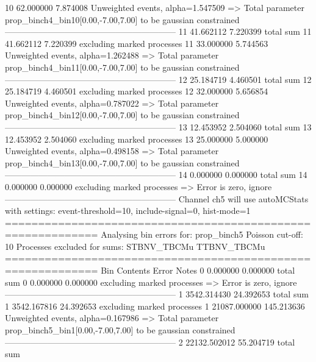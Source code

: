 10         62.000000       7.874008        Unweighted events, alpha=1.547509
  => Total parameter prop_binch4_bin10[0.00,-7.00,7.00] to be gaussian constrained
------------------------------------------------------------
11         41.662112       7.220399        total sum                     
11         41.662112       7.220399        excluding marked processes    
11         33.000000       5.744563        Unweighted events, alpha=1.262488
  => Total parameter prop_binch4_bin11[0.00,-7.00,7.00] to be gaussian constrained
------------------------------------------------------------
12         25.184719       4.460501        total sum                     
12         25.184719       4.460501        excluding marked processes    
12         32.000000       5.656854        Unweighted events, alpha=0.787022
  => Total parameter prop_binch4_bin12[0.00,-7.00,7.00] to be gaussian constrained
------------------------------------------------------------
13         12.453952       2.504060        total sum                     
13         12.453952       2.504060        excluding marked processes    
13         25.000000       5.000000        Unweighted events, alpha=0.498158
  => Total parameter prop_binch4_bin13[0.00,-7.00,7.00] to be gaussian constrained
------------------------------------------------------------
14         0.000000        0.000000        total sum                     
14         0.000000        0.000000        excluding marked processes    
  => Error is zero, ignore      
------------------------------------------------------------
Channel ch5 will use autoMCStats with settings: event-threshold=10, include-signal=0, hist-mode=1
============================================================
Analysing bin errors for: prop_binch5
Poisson cut-off: 10
Processes excluded for sums: STBNV_TBCMu TTBNV_TBCMu
============================================================
Bin        Contents        Error           Notes                         
0          0.000000        0.000000        total sum                     
0          0.000000        0.000000        excluding marked processes    
  => Error is zero, ignore      
------------------------------------------------------------
1          3542.314430     24.392653       total sum                     
1          3542.167816     24.392653       excluding marked processes    
1          21087.000000    145.213636      Unweighted events, alpha=0.167986
  => Total parameter prop_binch5_bin1[0.00,-7.00,7.00] to be gaussian constrained
------------------------------------------------------------
2          22132.502012    55.204719       total sum                     
